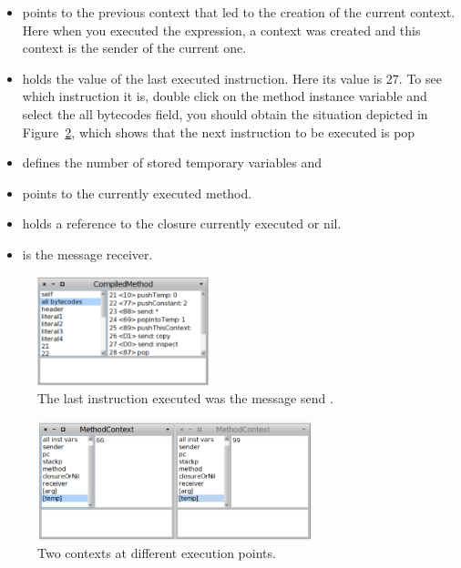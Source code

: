 \documentclass[a4paper,10pt,twoside]{book}
\begin{document}
\begin{itemize}
\item {} points to the previous context that led to the creation of the current context. Here when you executed the expression, a context was created and this context is the sender of the current one. 

\item {} holds the value of the last executed instruction. Here its value is 27. To see which instruction it is, double click on the method instance variable and select the all bytecodes field, you should obtain the situation depicted in Figure~\ref{ByteCodes}, which shows that the next instruction to be executed is pop 

\item {} defines the number of stored temporary variables and 

\item {} points to the currently executed method.

\item {} holds a reference to the closure currently executed or nil.

\item {} is the message receiver.
\end{itemize}


\begin{figure}[!h]
\begin{center}\includegraphics[width=5cm]{ByteCodes}
\caption{The last instruction executed was the message send .\label{ByteCodes}}
\end{center}
\end{figure}




\begin{figure}[!h]
\begin{center}\includegraphics[width=8cm]{TwoContexts}
\caption{Two contexts at different execution points.\label{ByteCodes}}
\end{center}
\end{figure}
\end{document}
